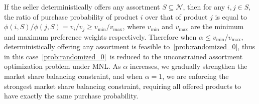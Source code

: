\documentclass[mnsc,non-blindrev]{informs3}
\theoremstyle{definition}
\begin{document}
If the seller deterministically offers any assortment $S\subseteq\mathcal{N}$, then for any $i,j\in S$, the ratio of purchase probability of product $i$ over that of product $j$ is equal to $\phi(i,S)/\phi(j,S)=v_i/v_j\geq v_{\min}/v_{\max}$, where $v_{\min}$ and $v_{\max}$ are the minimum and maximum preference weights respectively. Therefore when $\alpha\leq v_{\min}/v_{\max}$, deterministically offering any assortment is feasible to~\ref{prob:randomized_0}, thus in this case~\ref{prob:randomized_0}~is reduced to the unconstrained assortment optimization problem under MNL. As $\alpha$ increases, we gradually strengthen the market share balancing constraint, and when $\alpha=1$, we are enforcing the strongest market share balancing constraint, requiring all offered products to have exactly the same purchase probability.
\end{document}
